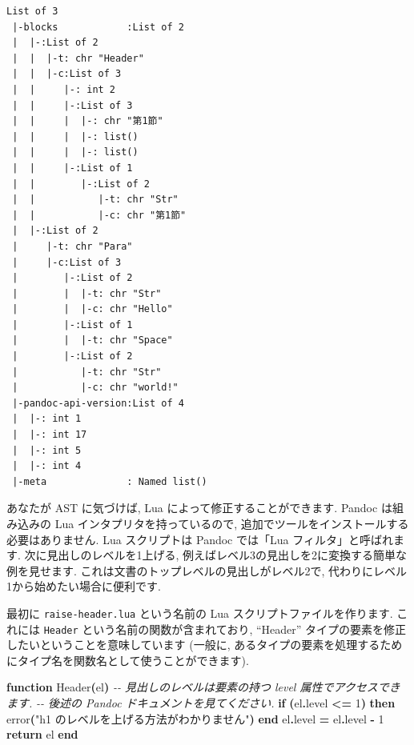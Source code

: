 \documentclass[
  11pt,
  lualatex,ja=standard,jafont=noto]{bxjsreport}
\newenvironment{Shaded}{\begin{snugshade}}{\end{snugshade}}
\newcommand{\CommentTok}[1]{\textcolor[rgb]{0.56,0.35,0.01}{\textit{#1}}}
\newcommand{\ControlFlowTok}[1]{\textcolor[rgb]{0.13,0.29,0.53}{\textbf{#1}}}
\newcommand{\DecValTok}[1]{\textcolor[rgb]{0.00,0.00,0.81}{#1}}
\newcommand{\FunctionTok}[1]{\textcolor[rgb]{0.00,0.00,0.00}{#1}}
\newcommand{\KeywordTok}[1]{\textcolor[rgb]{0.13,0.29,0.53}{\textbf{#1}}}
\newcommand{\NormalTok}[1]{#1}
\newcommand{\OperatorTok}[1]{\textcolor[rgb]{0.81,0.36,0.00}{\textbf{#1}}}
\newcommand{\StringTok}[1]{\textcolor[rgb]{0.31,0.60,0.02}{#1}}
\begin{document}
\begin{verbatim}
List of 3
 |-blocks            :List of 2
 |  |-:List of 2
 |  |  |-t: chr "Header"
 |  |  |-c:List of 3
 |  |     |-: int 2
 |  |     |-:List of 3
 |  |     |  |-: chr "第1節"
 |  |     |  |-: list()
 |  |     |  |-: list()
 |  |     |-:List of 1
 |  |        |-:List of 2
 |  |           |-t: chr "Str"
 |  |           |-c: chr "第1節"
 |  |-:List of 2
 |     |-t: chr "Para"
 |     |-c:List of 3
 |        |-:List of 2
 |        |  |-t: chr "Str"
 |        |  |-c: chr "Hello"
 |        |-:List of 1
 |        |  |-t: chr "Space"
 |        |-:List of 2
 |           |-t: chr "Str"
 |           |-c: chr "world!"
 |-pandoc-api-version:List of 4
 |  |-: int 1
 |  |-: int 17
 |  |-: int 5
 |  |-: int 4
 |-meta              : Named list()
\end{verbatim}

あなたが AST に気づけば, Lua によって修正することができます. Pandoc は組み込みの Lua インタプリタを持っているので, 追加でツールをインストールする必要はありません. Lua スクリプトは Pandoc では「Lua フィルタ」と呼ばれます. 次に見出しのレベルを1上げる, 例えばレベル3の見出しを2に変換する簡単な例を見せます. これは文書のトップレベルの見出しがレベル2で, 代わりにレベル1から始めたい場合に便利です.

最初に \texttt{raise-header.lua} という名前の Lua スクリプトファイルを作ります. これには \texttt{Header} という名前の関数が含まれており, ``Header'' タイプの要素を修正したいということを意味しています (一般に, あるタイプの要素を処理するためにタイプ名を関数名として使うことができます).

\begin{Shaded}
\begin{Highlighting}[numbers=left,,]
\KeywordTok{function}\NormalTok{ Header}\OperatorTok{(}\NormalTok{el}\OperatorTok{)}
  \CommentTok{{-}{-} 見出しのレベルは要素の持つ \textquotesingle{}level\textquotesingle{} 属性でアクセスできます.}
  \CommentTok{{-}{-} 後述の Pandoc ドキュメントを見てください.}
  \ControlFlowTok{if} \OperatorTok{(}\NormalTok{el}\OperatorTok{.}\NormalTok{level }\OperatorTok{\textless{}=} \DecValTok{1}\OperatorTok{)} \ControlFlowTok{then}
    \FunctionTok{error}\OperatorTok{(}\StringTok{"h1 のレベルを上げる方法がわかりません"}\OperatorTok{)}
  \ControlFlowTok{end}
\NormalTok{  el}\OperatorTok{.}\NormalTok{level }\OperatorTok{=}\NormalTok{ el}\OperatorTok{.}\NormalTok{level }\OperatorTok{{-}} \DecValTok{1}
  \ControlFlowTok{return}\NormalTok{ el}
\KeywordTok{end}
\end{Highlighting}
\end{Shaded}
\end{document}
